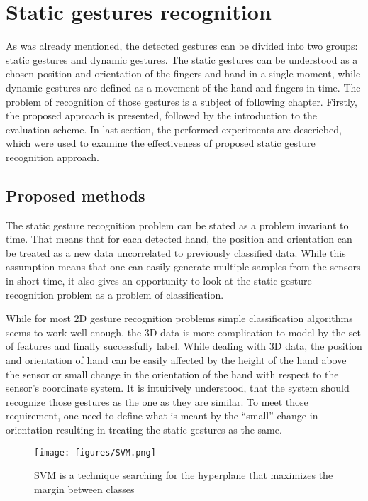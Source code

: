 
\chapter{Static gestures recognition}

As was already mentioned, the detected gestures can be divided into two groups: static gestures and dynamic gestures.
The static gestures can be understood as a chosen position and orientation of the fingers and hand in a single moment, while dynamic gestures are defined as a movement of the hand and fingers in time. 
The problem of recognition of those gestures is a subject of following chapter. 
Firstly, the proposed approach is presented, followed by the introduction to the evaluation scheme. 
In last section, the performed experiments are descriebed, which were used to examine the effectiveness of proposed static gesture recognition approach.

\section{Proposed methods}

The static gesture recognition problem can be stated as a problem invariant to time.
That means that for each detected hand, the position and orientation can be treated as a new data uncorrelated to previously classified data.
While this assumption means that one can easily generate multiple samples from the sensors in short time, it also gives an opportunity to look at the static gesture recognition problem as a problem of classification.

While for most 2D gesture recognition problems simple classification algorithms seems to work well enough, the 3D data is more complication to model by the set of features and finally successfully label.
While dealing with 3D data, the position and orientation of hand can be easily affected by the height of the hand above the sensor or small change in the orientation of the hand with respect to the sensor's coordinate system. 
It is intuitively understood, that the system should recognize those gestures as the one as they are similar.
To meet those requirement, one need to define what is meant by the ``small'' change in orientation resulting in treating the static gestures as the same.

\begin{figure}[htb]
\centering
 \texttt{[image: figures/SVM.png]}
 \caption[]{SVM is a technique searching for the hyperplane that maximizes the margin between classes\footnotemark}
 \label{svmmargin}
\end{figure}



